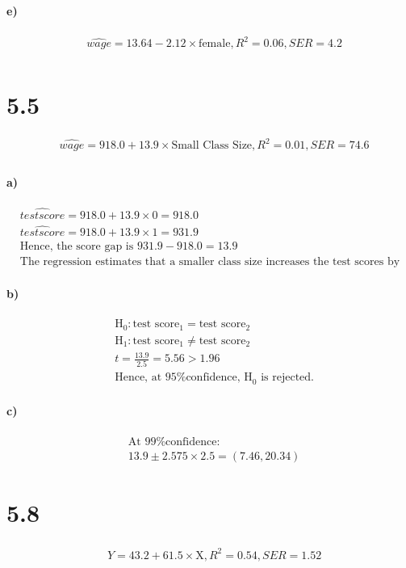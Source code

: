 \documentclass[letterpaper,12pt,titlepage,oneside,final]{book}
\begin{document}
\paragraph{e)}
\begin{align*}
&\hat{wage} = 13.64 - 2.12 \times \text{female}, R^2 = 0.06, SER= 4.2\\
\end{align*}

\section*{5.5}
\begin{align*}
&\hat{wage} = 918.0 + 13.9 \times \text{Small Class Size}, R^2 = 0.01, SER= 74.6\\
\end{align*}
\paragraph{a)}
\begin{align*}
&\hat{test score} = 918.0 + 13.9 \times 0 = 918.0\\
&\hat{test score} = 918.0 + 13.9 \times 1 = 931.9\\
&\text{Hence, the score gap is } 931.9-918.0 = 13.9\\
&\text{The regression estimates that a smaller class size increases the test scores by 13.9 points}
\end{align*}
\paragraph{b)}
\begin{align*}
&\text{H}_0 : \text{test score}_1 = \text{test score}_2 \\
&\text{H}_1 : \text{test score}_1 \neq \text{test score}_2\\
&t = \frac{13.9}{2.5} = 5.56 > 1.96\\
&\text{Hence, at 95\% confidence, H}_0 \text{ is rejected.}
\end{align*}
\paragraph{c)}
\begin{align*}
&\text{At 99\% confidence:}\\
&13.9\pm 2.575 \times 2.5 = (7.46, 20.34)
\end{align*}

\section*{5.8}
\begin{align*}
&\hat{Y} = 43.2 + 61.5 \times \text{X}, R^2 = 0.54, SER= 1.52\\
\end{align*}
\end{document}
